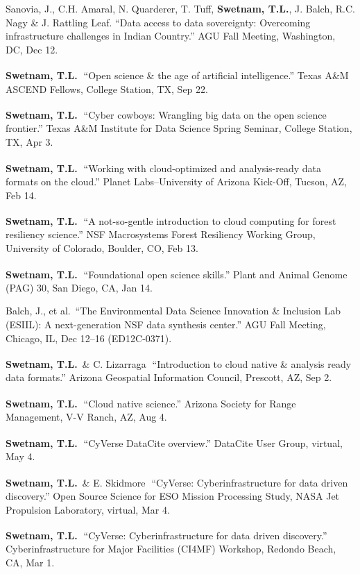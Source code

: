 \documentclass[11pt,letterpaper]{article}
\newcommand{\me}{\textbf{Swetnam, T.L.}}
\newcommand{\inv}{\textsuperscript{\color{cherry}\,\ding{72}}}
\newcommand{\yearhead}[1]{\par\vspace{5pt}{\small\bfseries\color{cherry}#1}\par\vspace{2pt}}
\newenvironment{hanglist}
  {\begin{list}{}{\setlength{\leftmargin}{1.4em}\setlength{\itemindent}{-1.4em}%
     \setlength{\itemsep}{3pt}\setlength{\parsep}{0pt}\setlength{\topsep}{1pt}}}
  {\end{list}}
\begin{document}
\yearhead{2023}
\begin{hanglist}
\item Sanovia, J., C.H. Amaral, N. Quarderer, T. Tuff, \me, J. Balch, R.C. Nagy \& J. Rattling Leaf. ``Data access to data sovereignty: Overcoming infrastructure challenges in Indian Country.'' AGU Fall Meeting, Washington, DC, Dec 12.
\item \me\inv\ ``Open science \& the age of artificial intelligence.'' Texas A\&M ASCEND Fellows, College Station, TX, Sep 22.
\item \me\inv\ ``Cyber cowboys: Wrangling big data on the open science frontier.'' Texas A\&M Institute for Data Science Spring Seminar, College Station, TX, Apr 3.
\item \me\inv\ ``Working with cloud-optimized and analysis-ready data formats on the cloud.'' Planet Labs--University of Arizona Kick-Off, Tucson, AZ, Feb 14.
\item \me\inv\ ``A not-so-gentle introduction to cloud computing for forest resiliency science.'' NSF Macrosystems Forest Resiliency Working Group, University of Colorado, Boulder, CO, Feb 13.
\item \me\inv\ ``Foundational open science skills.'' Plant and Animal Genome (PAG) 30, San Diego, CA, Jan 14.
\end{hanglist}

\yearhead{2022}
\begin{hanglist}
\item Balch, J., et al.\ ``The Environmental Data Science Innovation \& Inclusion Lab (ESIIL): A next-generation NSF data synthesis center.'' AGU Fall Meeting, Chicago, IL, Dec 12--16 (ED12C-0371).
\item \me\ \& C. Lizarraga\inv\ ``Introduction to cloud native \& analysis ready data formats.'' Arizona Geospatial Information Council, Prescott, AZ, Sep 2.
\item \me\inv\ ``Cloud native science.'' Arizona Society for Range Management, V-V Ranch, AZ, Aug 4.
\item \me\inv\ ``CyVerse DataCite overview.'' DataCite User Group, virtual, May 4.
\item \me\ \& E. Skidmore\inv\ ``CyVerse: Cyberinfrastructure for data driven discovery.'' Open Source Science for ESO Mission Processing Study, NASA Jet Propulsion Laboratory, virtual, Mar 4.
\item \me\inv\ ``CyVerse: Cyberinfrastructure for data driven discovery.'' Cyberinfrastructure for Major Facilities (CI4MF) Workshop, Redondo Beach, CA, Mar 1.
\end{hanglist}
\end{document}
